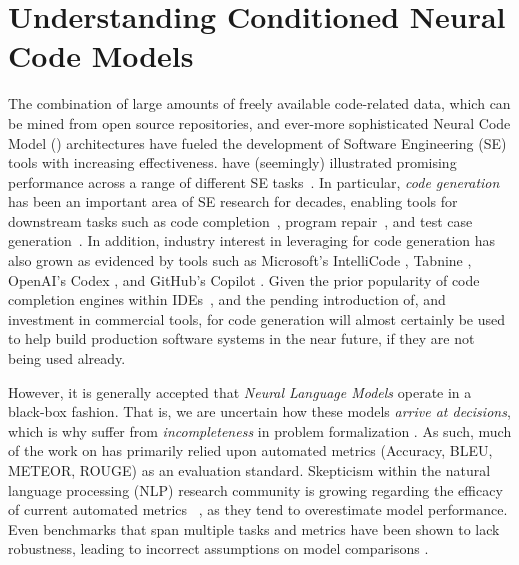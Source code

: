 \chapter{Understanding Conditioned \break Neural Code Models}
\label{ch6:conditioned}

The combination of large amounts of freely available code-related data, which can be mined from open source repositories, and ever-more sophisticated Neural Code Model (\nlm) architectures have fueled the development of Software Engineering (SE) tools with increasing effectiveness. \nlms have (seemingly) illustrated promising performance across a range of different SE tasks~\citep{Watson:ICSE20,White:MSR15,ciniselli2021empirical,Mastropaolo2021StudyingTasks}. In particular, \textit{code generation} has been an important area of SE research for decades, enabling tools for downstream tasks such as code completion~\citep{MSR-Completion}, program repair~\citep{Chen2019sequencer}, and test case generation~\citep{Watson:ICSE20}. In addition, industry interest in leveraging \nlms for code generation has also grown as evidenced by tools such as Microsoft's IntelliCode \citep{intellicode}, Tabnine \citep{tabnine}, OpenAI's Codex \citep{openai_codex}, and GitHub's Copilot \citep{github_copilot}. Given the prior popularity of code completion engines within IDEs~\citep{murphy2006ide}, and the pending introduction of, and investment in commercial tools, \nlms for code generation will almost certainly be used to help build production software systems in the near future, if they are not being used already.

However, it is generally accepted that \textit{Neural Language Models} operate in a black-box fashion. That is, we are uncertain how these models \textit{arrive at decisions}, which is why \nlms suffer from \textit{incompleteness} in problem formalization \citep{Doshi-Velez2017TowardsLearning}. As such, much of the work on \nlms has primarily relied upon automated metrics (\eg Accuracy, BLEU, METEOR, ROUGE) as an evaluation standard. Skepticism within the natural language processing (NLP) research community is growing regarding the efficacy of current automated metrics ~\citep{ribeiro2020checklist, rei2020comet, kocmi2021ship}, as they tend to overestimate model performance. Even benchmarks that span multiple tasks and metrics have been shown to lack robustness, leading to incorrect assumptions on model comparisons \citep{dehghani2021benchmark}. 

